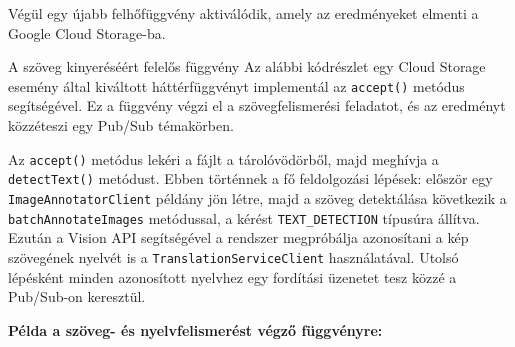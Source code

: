\documentclass[
]{article}
\begin{document}
Végül egy újabb felhőfüggvény aktiválódik, amely az eredményeket elmenti
a Google Cloud Storage-ba.

A szöveg kinyeréséért felelős függvény Az alábbi kódrészlet egy Cloud
Storage esemény által kiváltott háttérfüggvényt implementál az
\texttt{accept()} metódus segítségével. Ez a függvény végzi el a
szövegfelismerési feladatot, és az eredményt közzéteszi egy Pub/Sub
témakörben.

Az \texttt{accept()} metódus lekéri a fájlt a tárolóvödörből, majd
meghívja a \texttt{detectText()} metódust. Ebben történnek a fő
feldolgozási lépések: először egy \texttt{ImageAnnotatorClient} példány
jön létre, majd a szöveg detektálása következik a
\texttt{batchAnnotateImages} metódussal, a kérést
\texttt{TEXT\_DETECTION} típusúra állítva. Ezután a Vision API
segítségével a rendszer megpróbálja azonosítani a kép szövegének nyelvét
is a \texttt{TranslationServiceClient} használatával. Utolsó lépésként
minden azonosított nyelvhez egy fordítási üzenetet tesz közzé a
Pub/Sub-on keresztül.

\textbf{Példa a szöveg- és nyelvfelismerést végző függvényre:}
\end{document}
